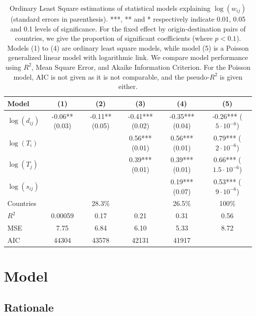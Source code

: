 \documentclass[11pt]{article}
\begin{document}
\begin{table}[h]
\caption{Ordinary Least Square estimations of statistical models explaining $\log(w_{ij})$ (standard errors in parenthesis). ***, ** and * respectively indicate 0.01, 0.05 and 0.1 levels of significance. For the fixed effect by origin-destination pairs of countries, we give the proportion of significant coefficients (where $p<0.1$). Models (1) to (4) are ordinary least square models, while model (5) is a Poisson generalized linear model with logarithmic link. We compare model performance using $R^2$, Mean Square Error, and Akaike Information Criterion. For the Poisson model, AIC is not given as it is not comparable, and the pseudo-$R^2$ is given either.\label{tab:reg}}
\medskip
\begin{tabular}{|l|c|c|c|c|c|}
\hline
Model  & (1) & (2) & (3) & (4) & (5) \\ 
\hline
$\log(d_{ij})$ &      -0.06** (0.03) &   -0.11** (0.05)  & -0.41*** (0.02)  & -0.35*** (0.04)  &  -0.26*** ($5\cdot 10^{-6}$) \\
$\log(T_i)$ &   &   & 0.56*** (0.01) &  0.56*** (0.01) & 0.79*** ($2\cdot 10^{-6}$) \\
$\log(T_j)$ &     &   & 0.39*** (0.01) &  0.39*** (0.01) & 0.66***  ($1.5\cdot 10^{-6}$) \\
$\log(s_{ij})$ &     &   &  &  0.19*** (0.07) & 0.53*** ($9\cdot 10^{-6}$)  \\
Countries &    &  28.3\% &   &  26.5\% & 100\% \\
\hline
$R^2$ &       0.00059   &  0.17 & 0.21 &  0.31  &  0.56 \\
MSE & 7.75 & 6.84 & 6.10 & 5.33 & 8.72 \\
AIC &        44304   &  43578  &  42131  & 41917 &   \\
\hline
\end{tabular}
\end{table}



\section{Model}

\subsection{Rationale}
\end{document}
